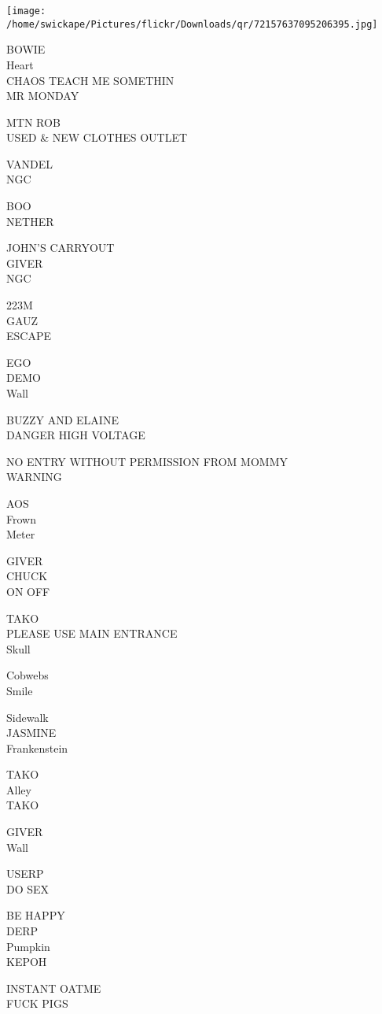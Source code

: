 \documentclass[10pt,letterpaper]{article}
\begin{document}
\texttt{[image: /home/swickape/Pictures/flickr/Downloads/qr/72157637095206395.jpg]}


BOWIE\\
Heart\\
CHAOS TEACH ME SOMETHIN\\
MR MONDAY

MTN ROB\\
USED \& NEW CLOTHES OUTLET

VANDEL\\
NGC

BOO\\
NETHER

JOHN'S CARRYOUT\\
GIVER\\
NGC

223M\\
GAUZ\\
ESCAPE

EGO\\
DEMO\\
Wall

BUZZY AND ELAINE\\
DANGER HIGH VOLTAGE

NO ENTRY WITHOUT PERMISSION FROM MOMMY\\
WARNING

AOS\\
Frown\\
Meter

GIVER\\
CHUCK\\
ON OFF

TAKO\\
PLEASE USE MAIN ENTRANCE\\
Skull

Cobwebs\\
Smile

Sidewalk\\
JASMINE\\
Frankenstein

TAKO\\
Alley\\
TAKO

GIVER\\
Wall

USERP\\
DO SEX

BE HAPPY\\
DERP\\
Pumpkin\\
KEPOH

INSTANT OATME\\
FUCK PIGS
\end{document}

